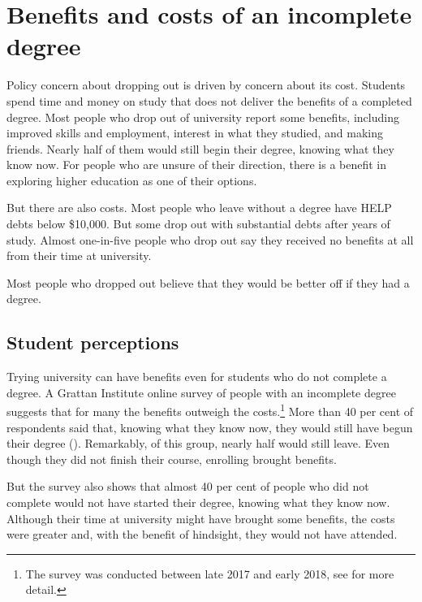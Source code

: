 \chapter{Benefits and costs of an incomplete degree} \label{chap:2}

Policy concern about dropping out is driven by concern about its cost. Students spend time and money on study that does not deliver the benefits of a completed degree. Most people who drop out of university report some benefits, including improved skills and employment, interest in what they studied, and making friends. Nearly half of them would still begin their degree, knowing what they know now. For people who are unsure of their direction, there is a benefit in exploring higher education as one of their options.

But there are also costs. Most people who leave without a degree have HELP debts below \$10,000. But some drop out with substantial debts after years of study. Almost one-in-five people who drop out say they received no benefits at all from their time at university.

Most people who dropped out believe that they would be better off if they had a degree.

\section{Student perceptions}\label{sec:2.1}

Trying university can have benefits even for students who do not complete a degree. A Grattan Institute online survey of people with an incomplete degree suggests that for many the benefits outweigh the costs.\footnote{The survey was conducted between late 2017 and early 2018, see  for more detail.} More than 40 per cent of respondents said that, knowing what they know now, they would still have begun their degree (). Remarkably, of this group, nearly half would still leave. Even though they did not finish their course, enrolling brought benefits.

But the survey also shows that almost 40 per cent of people who did not complete would not have started their degree, knowing what they know now. Although their time at university might have brought some benefits, the costs were greater and, with the benefit of hindsight, they would not have attended.

